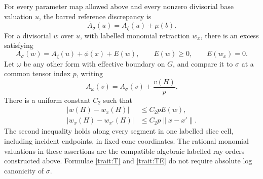 \begin{proposition}
\label{prop:trait-comparison}
For every parameter map allowed above and every nonzero
divisorial base valuation \(u\), the barred reference
discrepancy is
\begin{equation}
 \bar A_\sigma(u)=A_\zeta(u)+\mu(b).
 \tag{T}\label{trait:T}
\end{equation}
For a divisorial \(w\) over \(u\), with labelled monomial
retraction \(w_x\), there is an excess satisfying
\begin{equation}
 A_\sigma(w)=A_\zeta(u)+\phi(x)+E(w),\qquad
 E(w)\ge0,\qquad E(w_x)=0.
 \tag{TE}\label{trait:TE}
\end{equation}
Let \(\omega\) be any other form with effective boundary
on \(G\), and compare it to \(\sigma\) at a common tensor
index \(p\), writing
\[
 A_\omega(v)=A_\sigma(v)+\frac{v(H)}p.
\]
There is a uniform constant \(C_2\) such that
\begin{equation}
 \begin{split}
 |w(H)-w_x(H)|&\le C_2pE(w),\\
 |w_x(H)-w_{x'}(H)|&\le C_2p\|x-x'\|.
 \end{split}
 \tag{TV}\label{trait:TV}
\end{equation}
The second inequality holds along every segment in one
labelled slice cell, including incident endpoints, in
fixed cone coordinates.  The rational monomial valuations
in these assertions are the compatible algebraic labelled
ray orders constructed above.  Formulae \eqref{trait:T}
and \eqref{trait:TE} do not require absolute log
canonicity of \(\sigma\).
\end{proposition}

